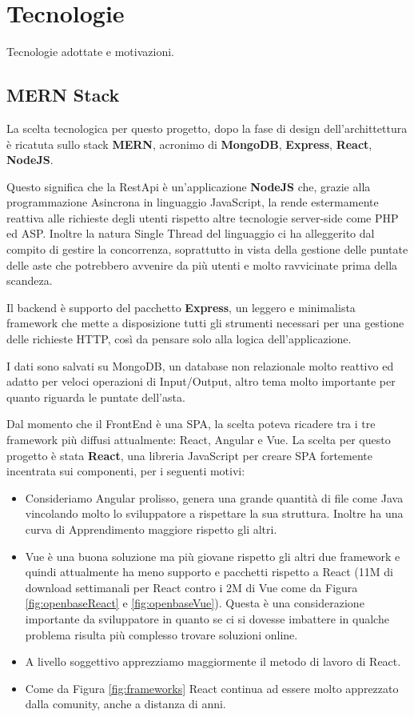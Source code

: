 \section{Tecnologie}
Tecnologie adottate e motivazioni.

\subsection{MERN Stack}
La scelta tecnologica per questo progetto, dopo la fase di design dell'archittettura 
è ricatuta sullo stack \textbf{MERN}, acronimo di \textbf{MongoDB}, \textbf{Express}, \textbf{React}, \textbf{NodeJS}.

Questo significa che la RestApi è un'applicazione \textbf{NodeJS} che, 
grazie alla programmazione Asincrona in linguaggio JavaScript, 
la rende estermamente reattiva alle richieste degli utenti rispetto altre tecnologie server-side come PHP ed ASP. 
Inoltre la natura Single Thread del linguaggio ci ha alleggerito dal compito di gestire la concorrenza,
soprattutto in vista della gestione delle puntate delle aste che potrebbero avvenire da più utenti e molto ravvicinate prima della scandeza.

Il backend è supporto del pacchetto \textbf{Express}, 
un leggero e minimalista framework che mette a disposizione tutti gli strumenti necessari per una gestione delle richieste HTTP, 
così da pensare solo alla logica dell'applicazione.

I dati sono salvati su MongoDB, un database non relazionale molto reattivo ed adatto per veloci operazioni di Input/Output, 
altro tema molto importante per quanto riguarda le puntate dell'asta.

Dal momento che il FrontEnd è una SPA, la scelta poteva ricadere tra i tre framework più diffusi attualmente: React, Angular e Vue.
La scelta per questo progetto è stata \textbf{React}, una libreria JavaScript per creare SPA fortemente incentrata sui componenti, per i seguenti motivi:

\begin{itemize}
	\item Consideriamo Angular prolisso, genera una grande quantità di file come Java vincolando molto lo sviluppatore a rispettare la sua struttura. 
	Inoltre ha una curva di Apprendimento maggiore rispetto gli altri.
	\item Vue è una buona soluzione ma più giovane rispetto gli altri due framework e quindi attualmente ha meno supporto e pacchetti rispetto a React 
	(11M di download settimanali per React contro i 2M di Vue come da Figura \underline{\ref{fig:openbaseReact}} e \underline{\ref{fig:openbaseVue}}). 
	Questa è una considerazione importante da sviluppatore in quanto se ci si dovesse imbattere in qualche problema risulta più complesso trovare soluzioni online.
	\item A livello soggettivo apprezziamo maggiormente il metodo di lavoro di React. 
	\item Come da Figura \underline{\ref{fig:frameworks}} React continua ad essere molto apprezzato dalla comunity, anche a distanza di anni. 
\end{itemize} 

